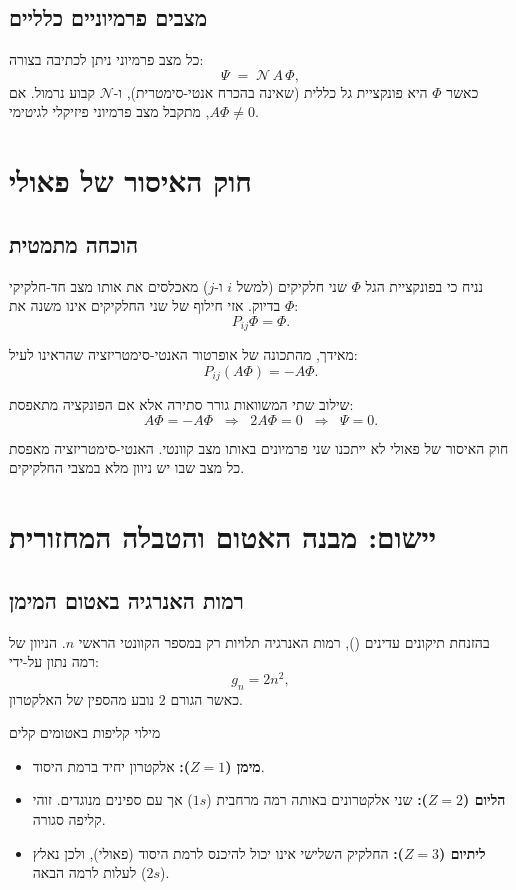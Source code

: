\subsection{מצבים פרמיוניים כלליים}
כל מצב פרמיוני ניתן לכתיבה בצורה:
\[
\Psi \;=\; \mathcal{N}\, A\,\Phi ,
\]
כאשר $\Phi$ היא פונקציית גל כללית (שאינה בהכרח אנטי-סימטרית), ו-$\mathcal{N}$ קבוע נרמול. אם $A\Phi\neq 0$, מתקבל מצב פרמיוני פיזיקלי לגיטימי.



\section{חוק האיסור של פאולי}

\subsection{הוכחה מתמטית}

נניח כי בפונקציית הגל $\Phi$ שני חלקיקים (למשל $i$ ו-$j$) מאכלסים את אותו מצב חד-חלקיקי בדיוק. אזי חילוף של שני החלקיקים אינו משנה את $\Phi$:
\[
P_{ij}\Phi = \Phi .
\]

מאידך, מהתכונה של אופרטור האנטי-סימטריזציה שהראינו לעיל:
\[
P_{ij}(A\Phi)= -A\Phi .
\]

שילוב שתי המשוואות גורר סתירה אלא אם הפונקציה מתאפסת:
\[
A\Phi = -A\Phi \;\;\Rightarrow\;\; 2A\Phi = 0 \;\;\Rightarrow\;\; \Psi = 0.
\]

\begin{theorembox}{חוק האיסור של פאולי}
לא ייתכנו שני פרמיונים באותו מצב קוונטי. האנטי-סימטריזציה מאפסת כל מצב שבו יש ניוון מלא במצבי החלקיקים.
\end{theorembox}



\section{יישום: מבנה האטום והטבלה המחזורית}

\subsection{רמות האנרגיה באטום המימן}
בהזנחת תיקונים עדינים (), רמות האנרגיה תלויות רק במספר הקוונטי הראשי $n$. הניוון של רמה נתון על-ידי:
\[
g_n = 2n^2,
\]
כאשר הגורם $2$ נובע מהספין של האלקטרון.

\begin{examplebox}{מילוי קליפות באטומים קלים}
\begin{itemize}
    \item \textbf{מימן ($Z=1$):} אלקטרון יחיד ברמת היסוד.
    \item \textbf{הליום ($Z=2$):} שני אלקטרונים באותה רמה מרחבית ($1s$) אך עם ספינים מנוגדים. זוהי קליפה סגורה.
    \item \textbf{ליתיום ($Z=3$):} החלקיק השלישי אינו יכול להיכנס לרמת היסוד (פאולי), ולכן נאלץ לעלות לרמה הבאה ($2s$).
\end{itemize}
\end{examplebox}



